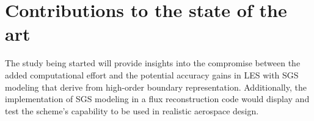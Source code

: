 \section{Contributions to the state of the art}
The study being started will provide insights into the compromise between the added computational effort and the potential accuracy gains in LES with SGS modeling that derive from high-order boundary representation. Additionally, the implementation of SGS modeling in a flux reconstruction code  would display and test the scheme's capability to be used in realistic aerospace design.